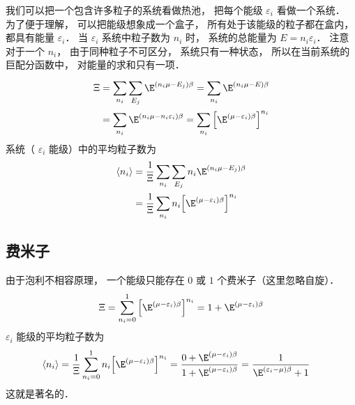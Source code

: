 
我们可以把一个包含许多粒子的系统看做热池， 把每个能级 ${\varepsilon_i}$ 看做一个系统． 为了便于理解， 可以把能级想象成一个盒子， 所有处于该能级的粒子都在盒内， 都具有能量 ${\varepsilon_i}$．  当 ${\varepsilon_i}$ 系统中粒子数为 ${n_i}$ 时， 系统的总能量为 $E = {n_i}{\varepsilon_i}$．  注意对于一个 ${n_i}$，  由于同种粒子不可区分， 系统只有一种状态， 所以在当前系统的巨配分函数中， 对能量的求和只有一项．
\begin{equation}
  \begin{aligned}
  \Xi & = \sum\limits_{{n_i}}^{} {\sum\limits_{{E_j}}^{} {{\E^{\left( {{n_i}\mu  - {E_j}} \right)\beta }}} }  = \sum\limits_{{n_i}}^{} {{\E^{\left( {{n_i}\mu  - E} \right)\beta }}}  \\
  & = \sum\limits_{{n_i}}^{} {{\E^{\left( {{n_i}\mu  - {n_i}{\varepsilon_i}} \right)\beta }}}  = \sum\limits_{{n_i}}^{} {{{\left[ {{\E^{\left( {\mu  - {\varepsilon_i}} \right)\beta }}} \right]}^{{n_i}}}}
  \end{aligned}
\end{equation}
系统（ ${\varepsilon_i}$ 能级）中的平均粒子数为
\begin{equation}
\begin{aligned}
  \left\langle {{n_i}} \right\rangle  & = \frac{1}{\Xi }\sum\limits_{{n_i}}^{} {\sum\limits_{{E_j}}^{} {{n_i}{\E^{\left( {{n_i}\mu  - {E_j}} \right)\beta }}} }  \\
  & = \frac{1}{\Xi }\sum\limits_{{n_i}}^{} {{n_i}{{\left[ {{\E^{\left( {\mu  - {\varepsilon_i}} \right)\beta }}} \right]}^{{n_i}}}}
\end{aligned}
\end{equation}
\subsection{费米子}
由于泡利不相容原理， 一个能级只能存在 $0$ 或 $1$ 个费米子（这里忽略自旋）．
\begin{equation}
  \Xi  = \sum\limits_{{n_i} = 0}^1 {{{\left[ {{\E^{\left( {\mu  - {\varepsilon_i}} \right)\beta }}} \right]}^{{n_i}}}}  = 1 + {\E^{\left( {\mu  - {\varepsilon_i}} \right)\beta }}
\end{equation}
 ${\varepsilon_i}$ 能级的平均粒子数为
\begin{equation}
\begin{aligned}
\left\langle {{n_i}} \right\rangle & = \frac{1}{\Xi }\sum\limits_{{n_i} = 0}^1 {{n_i}{{\left[ {{\E^{\left( {\mu  - {\varepsilon_i}} \right)\beta }}} \right]}^{{n_i}}}} = \frac{{0 + {\E^{\left( {\mu  - {\varepsilon_i}} \right)\beta }}}}{{1 + {\E^{\left( {\mu  - {\varepsilon_i}} \right)\beta }}}}  = \frac{1}{{{\E^{\left( {{\varepsilon_i} - \mu } \right)\beta }} + 1}}
\end{aligned}
\end{equation}
  这就是著名的．
